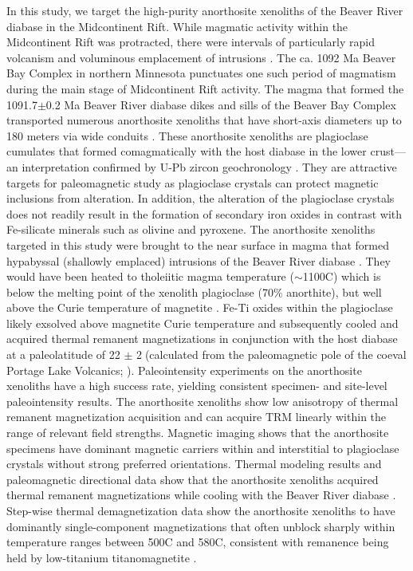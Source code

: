 \documentclass[9pt,twocolumn,twoside,lineno]{pnas-new}
\begin{document}
In this study, we target the high-purity anorthosite xenoliths of the Beaver River diabase in the Midcontinent Rift. While magmatic activity within the Midcontinent Rift was protracted, there were intervals of particularly rapid volcanism and voluminous emplacement of intrusions \cite{Swanson-Hysell2021a}. The ca. 1092 Ma Beaver Bay Complex in northern Minnesota punctuates one such period of magmatism during the main stage of Midcontinent Rift activity. The magma that formed the 1091.7$\pm$0.2 Ma Beaver River diabase dikes and sills of the Beaver Bay Complex transported numerous anorthosite xenoliths that have short-axis diameters up to 180 meters via wide conduits \cite{Boerboom2004a, Boerboom2006b}. These anorthosite xenoliths are plagioclase cumulates that formed comagmatically with the host diabase in the lower crust---an interpretation confirmed by U-Pb zircon geochronology \cite{Zhang2021b}. They are attractive targets for paleomagnetic study as plagioclase crystals can protect magnetic inclusions from alteration. In addition, the alteration of the plagioclase crystals does not readily result in the formation of secondary iron oxides in contrast with Fe-silicate minerals such as olivine and pyroxene. The anorthosite xenoliths targeted in this study were brought to the near surface in magma that formed hypabyssal (shallowly emplaced) intrusions of the Beaver River diabase \cite{Zhang2021b}. They would have been heated to tholeiitic magma temperature ($\sim$1100\textdegree C) which is below the melting point of the xenolith plagioclase (70$\%$ anorthite), but well above the Curie temperature of magnetite \cite{Zhang2021b}. Fe-Ti oxides within the plagioclase likely exsolved above magnetite Curie temperature \cite{Bian2021a} and subsequently cooled and acquired thermal remanent magnetizations in conjunction with the host diabase at a paleolatitude of 22 $\pm$ 2\textdegree$\;$(calculated from the paleomagnetic pole of the coeval Portage Lake Volcanics; \citealp{Swanson-Hysell2019a}). Paleointensity experiments on the anorthosite xenoliths have a high success rate, yielding consistent specimen- and site-level paleointensity results. The anorthosite xenoliths show low anisotropy of thermal remanent magnetization acquisition and can acquire TRM linearly within the range of relevant field strengths. Magnetic imaging shows that the anorthosite specimens have dominant magnetic carriers within and interstitial to plagioclase crystals without strong preferred orientations. Thermal modeling results and paleomagnetic directional data show that the anorthosite xenoliths acquired thermal remanent magnetizations while cooling with the Beaver River diabase \cite{Zhang2021b}. Step-wise thermal demagnetization data show the anorthosite xenoliths to have dominantly single-component magnetizations that often unblock sharply within temperature ranges between 500\textdegree C and 580\textdegree C, consistent with remanence being held by low-titanium titanomagnetite \cite{Zhang2021b}. 
\end{document}
